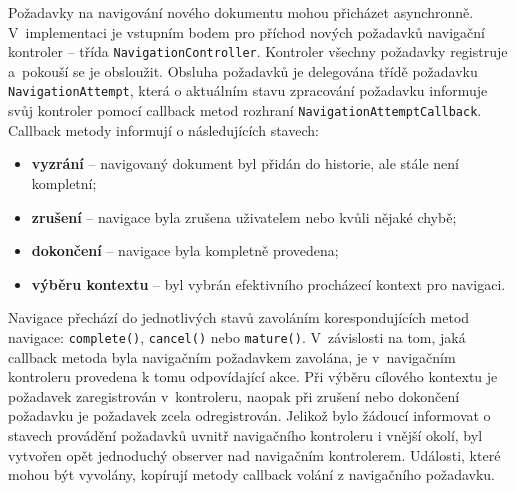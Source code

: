 Požadavky na navigování nového dokumentu mohou přicházet asynchronně. V~implementaci je vstupním bodem pro příchod nových požadavků navigační kontroler -- třída \texttt{NavigationController}. Kontroler všechny požadavky registruje a~pokouší se je obsloužit. Obsluha požadavků je delegována třídě požadavku \texttt{NavigationAttempt}, která o aktuálním stavu zpracování požadavku informuje svůj kontroler pomocí callback metod rozhraní \texttt{NavigationAttemptCallback}. Callback metody informují o následujících stavech:

\begin{itemize}
  \item \textbf{vyzrání} -- navigovaný dokument byl přidán do historie, ale stále není kompletní;
  \item \textbf{zrušení} -- navigace byla zrušena uživatelem nebo kvůli nějaké chybě;
  \item \textbf{dokončení} -- navigace byla kompletně provedena; 
  \item \textbf{výběru kontextu} -- byl vybrán efektivního procházecí kontext pro navigaci.
\end{itemize}

Navigace přechází do jednotlivých stavů zavoláním korespondujících metod navigace: \texttt{complete()}, \texttt{cancel()} nebo \texttt{mature()}. V~závislosti na tom, jaká callback metoda byla navigačním požadavkem zavolána, je v~navigačním kontroleru provedena k tomu odpovídající akce. Při výběru cílového kontextu je požadavek zaregistrován v~kontroleru, naopak při zrušení nebo dokončení požadavku je požadavek zcela odregistrován. Jelikož bylo žádoucí informovat o stavech provádění požadavků uvnitř navigačního kontroleru i vnější okolí, byl vytvořen opět jednoduchý observer nad navigačním kontrolerem. Události, které mohou být vyvolány, kopírují metody callback volání z navigačního požadavku. 

